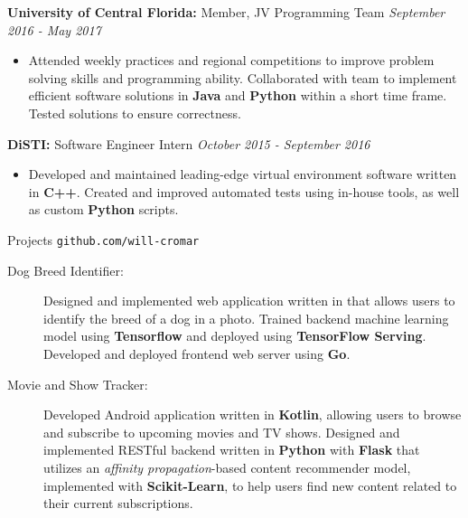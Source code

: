 \documentclass[letterpaper,11pt,oneside]{article}
\newcommand{\resheader}[2][]{
  \vspace{9pt}
  {\LARGE #2} #1
  \\
}
\newcommand{\ressubheader}[3][]{
  \vspace{6pt}
  {\textbf{#2} #1} \hfill \emph{#3}
  \\
}
\newcommand{\resskill}[1]{\textbf{#1}}
\begin{document}
\ressubheader[Member, JV Programming Team]{University of Central Florida:}{September 2016 - May 2017}
\begin{itemize}
  \item Attended weekly practices and regional competitions to improve problem solving skills and programming ability. Collaborated with team to implement efficient software solutions in \resskill{Java} and \resskill{Python} within a short time frame. Tested solutions to ensure correctness.
\end{itemize}

\ressubheader[Software Engineer Intern]{DiSTI:}{October 2015 - September 2016}
\begin{itemize}
  \item Developed and maintained leading-edge virtual environment software written in \resskill{C++}. Created and improved automated tests using in-house tools, as well as custom \resskill{Python} scripts.
\end{itemize}

\resheader[\hfill \texttt{github.com/will-cromar}]{Projects}
\begin{description}
  \item [Dog Breed Identifier:] Designed and implemented web application written in that allows users to identify the breed of a dog in a photo. Trained backend machine learning model using \resskill{Tensorflow} and deployed using \resskill{TensorFlow Serving}. Developed and deployed frontend web server using \resskill{Go}.
  \item [Movie and Show Tracker:] Developed Android application written in \resskill{Kotlin}, allowing users to browse and subscribe to upcoming movies and TV shows. Designed and implemented RESTful backend written in \resskill{Python} with \resskill{Flask} that utilizes an \emph{affinity propagation}-based content recommender model, implemented with \resskill{Scikit-Learn}, to help users find new content related to their current subscriptions.
\end{description}    
\end{document}
